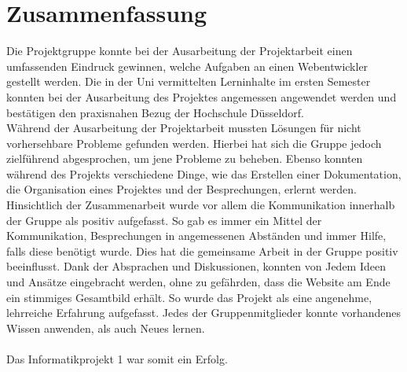 \section{Zusammenfassung}
Die Projektgruppe konnte bei der Ausarbeitung der Projektarbeit einen umfassenden Eindruck gewinnen, welche Aufgaben an einen Webentwickler gestellt werden. Die in der Uni vermittelten Lerninhalte im ersten Semester konnten bei der Ausarbeitung des Projektes angemessen angewendet werden und bestätigen den praxisnahen Bezug der Hochschule Düsseldorf. \\
Während der Ausarbeitung der Projektarbeit mussten Lösungen für nicht vorhersehbare Probleme gefunden werden. Hierbei hat sich die Gruppe jedoch zielführend abgesprochen, um jene Probleme zu beheben. Ebenso konnten während des Projekts verschiedene Dinge, wie das Erstellen einer Dokumentation, die Organisation eines Projektes und der Besprechungen, erlernt werden.\\
Hinsichtlich der Zusammenarbeit wurde vor allem die Kommunikation innerhalb der Gruppe als positiv aufgefasst. So gab es immer ein Mittel der Kommunikation, Besprechungen in angemessenen Abständen und immer Hilfe, falls diese benötigt wurde. Dies hat die gemeinsame Arbeit in der Gruppe positiv beeinflusst. Dank der Absprachen und Diskussionen, konnten von Jedem Ideen und Ansätze eingebracht werden, ohne zu gefährden, dass die Website am Ende ein stimmiges Gesamtbild erhält.
So wurde das Projekt als eine angenehme, lehrreiche Erfahrung aufgefasst. Jedes der Gruppenmitglieder konnte vorhandenes Wissen anwenden, als auch Neues lernen.\\
\\
Das Informatikprojekt 1 war somit ein Erfolg.